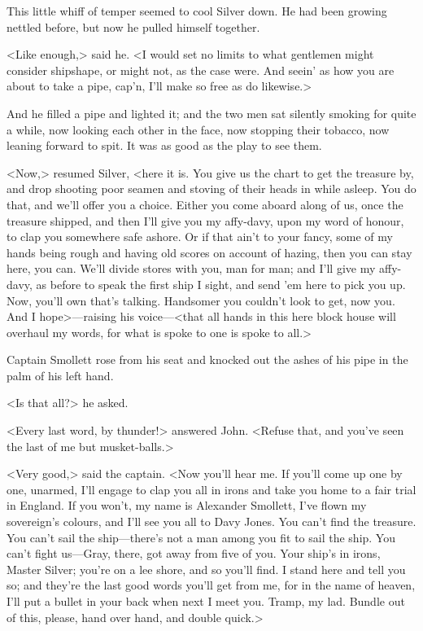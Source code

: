 This little whiff of temper seemed to cool Silver down. He had been growing nettled before, but now he pulled himself together.

<Like enough,> said he. <I would set no limits to what gentlemen might consider shipshape, or might not, as the case were. And seein' as how you are about to take a pipe, cap'n, I'll make so free as do likewise.>

And he filled a pipe and lighted it; and the two men sat silently smoking for quite a while, now looking each other in the face, now stopping their tobacco, now leaning forward to spit. It was as good as the play to see them.

<Now,> resumed Silver, <here it is. You give us the chart to get the treasure by, and drop shooting poor seamen and stoving of their heads in while asleep. You do that, and we'll offer you a choice. Either you come aboard along of us, once the treasure shipped, and then I'll give you my affy-davy, upon my word of honour, to clap you somewhere safe ashore. Or if that ain't to your fancy, some of my hands being rough and having old scores on account of hazing, then you can stay here, you can. We'll divide stores with you, man for man; and I'll give my affy-davy, as before to speak the first ship I sight, and send 'em here to pick you up. Now, you'll own that's talking. Handsomer you couldn't look to get, now you. And I hope>—raising his voice—<that all hands in this here block house will overhaul my words, for what is spoke to one is spoke to all.>

Captain Smollett rose from his seat and knocked out the ashes of his pipe in the palm of his left hand.

<Is that all?> he asked.

<Every last word, by thunder!> answered John. <Refuse that, and you've seen the last of me but musket-balls.>

<Very good,> said the captain. <Now you'll hear me. If you'll come up one by one, unarmed, I'll engage to clap you all in irons and take you home to a fair trial in England. If you won't, my name is Alexander Smollett, I've flown my sovereign's colours, and I'll see you all to Davy Jones. You can't find the treasure. You can't sail the ship—there's not a man among you fit to sail the ship. You can't fight us—Gray, there, got away from five of you. Your ship's in irons, Master Silver; you're on a lee shore, and so you'll find. I stand here and tell you so; and they're the last good words you'll get from me, for in the name of heaven, I'll put a bullet in your back when next I meet you. Tramp, my lad. Bundle out of this, please, hand over hand, and double quick.>

